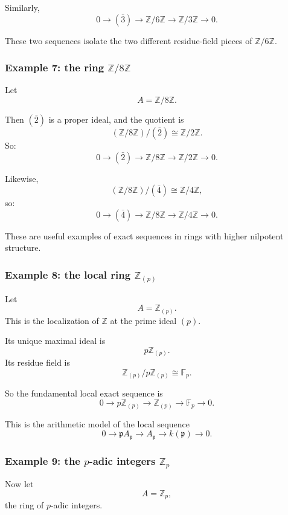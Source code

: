 \documentclass[12pt,a4paper]{article}
\theoremstyle{notespace}
\newcommand{\mf}{\mathfrak}
\theoremstyle{definition}
\begin{document}
Similarly,
\[
0 \longrightarrow (\bar 3) \longrightarrow \mathbb Z/6\mathbb Z \longrightarrow \mathbb Z/3\mathbb Z \longrightarrow 0.
\]

These two sequences isolate the two different residue-field pieces of \(\mathbb Z/6\mathbb Z\).

\subsubsection{Example 7: the ring \(\mathbb Z/8\mathbb Z\)}

Let
\[
A=\mathbb Z/8\mathbb Z.
\]

Then \((\bar 2)\) is a proper ideal, and the quotient is
\[
(\mathbb Z/8\mathbb Z)/(\bar 2)\cong \mathbb Z/2\mathbb Z.
\]
So:
\[
0 \longrightarrow (\bar 2) \longrightarrow \mathbb Z/8\mathbb Z \longrightarrow \mathbb Z/2\mathbb Z \longrightarrow 0.
\]

Likewise,
\[
(\mathbb Z/8\mathbb Z)/(\bar 4)\cong \mathbb Z/4\mathbb Z,
\]
so:
\[
0 \longrightarrow (\bar 4) \longrightarrow \mathbb Z/8\mathbb Z \longrightarrow \mathbb Z/4\mathbb Z \longrightarrow 0.
\]

These are useful examples of exact sequences in rings with higher nilpotent structure.

\subsubsection{Example 8: the local ring \(\mathbb Z_{(p)}\)}

Let
\[
A=\mathbb Z_{(p)}.
\]
This is the localization of \(\mathbb Z\) at the prime ideal \((p)\).

Its unique maximal ideal is
\[
p\mathbb Z_{(p)}.
\]
Its residue field is
\[
\mathbb Z_{(p)}/p\mathbb Z_{(p)}\cong \mathbb F_p.
\]

So the fundamental local exact sequence is
\[
0 \longrightarrow p\mathbb Z_{(p)}
\longrightarrow
\mathbb Z_{(p)}
\longrightarrow
\mathbb F_p
\longrightarrow 0.
\]

This is the arithmetic model of the local sequence
\[
0 \longrightarrow \mf p A_{\mf p} \longrightarrow A_{\mf p} \longrightarrow k(\mf p) \longrightarrow 0.
\]

\subsubsection{Example 9: the \(p\)-adic integers \(\mathbb Z_p\)}

Now let
\[
A=\mathbb Z_p,
\]
the ring of \(p\)-adic integers.
\end{document}
